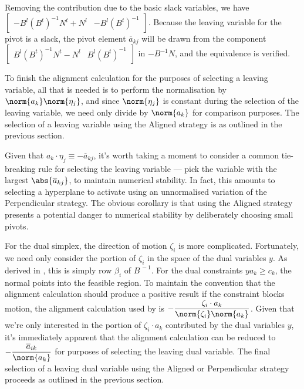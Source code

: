 Removing the contribution due to the basic slack variables, we have
$\begin{bmatrix} -B^l(B^t)^{-1} N^t + N^l &  -B^l(B^t)^{-1} \end{bmatrix}$.
Because the leaving variable for the pivot is a slack, the pivot element
$\overline{a}_{kj}$ will be drawn from the component
$\begin{bmatrix} B^l(B^t)^{-1}N^t - N^l & B^l(B^t)^{-1} \end{bmatrix}$ in
$-B^{-1}N$, and the equivalence is verified.

To finish the alignment calculation for the purposes of selecting a leaving
variable, all that is needed is to perform the normalisation by
$\norm{a_k}\norm{\eta_j}$, and since $\norm{\eta_j}$ is constant during the
selection of the leaving variable, we need only divide by $\norm{a_k}$ for
comparison purposes.
The selection of a leaving variable using the Aligned strategy is as outlined
in the previous section.

Given that $a_k \cdot \eta_j \equiv -\overline{a}_{kj}$, it's worth taking
a moment to consider a common tie-breaking rule for selecting the leaving
variable --- pick the variable with the largest $\abs{\overline{a}_{kj}}$,
to maintain numerical stability.
In fact, this amounts to selecting a hyperplane to activate using an
unnormalised variation of the Perpendicular strategy.
The obvious corollary is that using the Aligned strategy presents a potential
danger to numerical stability by deliberately choosing small pivots.

For the dual simplex, the direction of motion $\zeta_i$ is more complicated.
Fortunately, we need only consider the portion of $\zeta_i$ in the space of
the dual variables $y$.
As derived in ,
this is simply row $\beta_i$ of $B^{\,-1}$.
For the dual constraints $y a_k \geq c_k$, the normal points into the feasible
region.
To maintain the convention that the alignment calculation should produce a
positive result if the constraint blocks motion, the alignment calculation
used by \dylp is
$\displaystyle -\frac{\zeta_i \cdot a_k}{\norm{\zeta_i}\norm{a_k}}$.
Given that we're only interested in the portion of $\zeta_i \cdot a_k$
contributed by the dual variables $y$,
it's immediately apparent that the alignment
calculation can be reduced to
$\displaystyle -\frac{\overline{a}_{ik}}{\norm{a_k}}$ for purposes of selecting
the leaving dual variable.
The final selection of a leaving dual variable using the Aligned or
Perpendicular strategy proceeds as outlined in the previous section.


